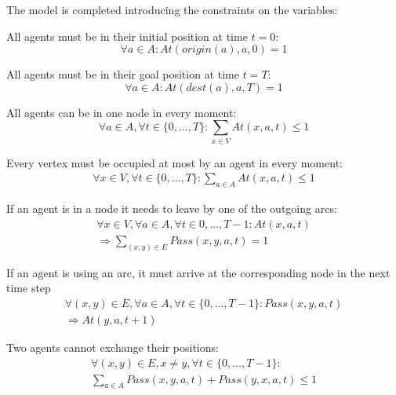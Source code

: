 \documentclass[12pt, a4paper, hidelinks]{article}
\numberwithin{equation}{section}
\begin{document}
The model is completed introducing the constraints on the variables:

\begin{description}\label{equation_set_1}
\item All agents must be in their initial position at time $t = 0$:
\begin{equation}
\forall a \in A: At(origin(a), a, 0) = 1
\label{eq:1.1}\end{equation}

\item All agents must be in their goal position at time $t = T$:
\begin{equation}
\forall a \in A : At(dest(a), a, T) = 1
\label{eq:1.2}\end{equation}

\item All agents can be in one node in every moment:
\begin{equation}
\forall a \in A, \forall t \in \{0,\dots,T\}: \displaystyle\sum_{x \in V}At(x,a,t)\leq1
\label{eq:1.3}\end{equation}

\item Every vertex must be occupied at most by an agent in every moment:
\begin{equation}\begin{split}
\forall x \in V, \forall t \in \{0,\dots,T\}: \displaystyle\sum_{a \in A}At(x,a,t)\leq1
\end{split}\label{eq:1.4}\end{equation}

\item If an agent is in a node it needs to leave by one of the outgoing arcs:
\begin{equation}\begin{split}
\forall x \in V, \forall a \in A, \forall t \in {0,\dots,T-1}: At(x,a,t) \\
\Rightarrow  \displaystyle\sum_{(x,y) \in E}Pass(x,y,a,t)=1
\end{split}\label{eq:1.5}\end{equation}

\item If an agent is using an arc, it must arrive at the corresponding node in the next time step
\begin{equation}\begin{split}
\forall (x,y) \in E, \forall a \in A, \forall t \in \{0,\dots,T-1\}: Pass(x,y,a,t) \\
\Rightarrow At(y,a,t+1)
\end{split}\label{eq:1.6}
\end{equation}

\item Two agents cannot exchange their positions:
\begin{equation}\begin{split}
\forall (x,y) \in E, x \neq y, \forall t \in \{0,\dots,T-1\}: \\
\displaystyle\sum_{a \in A}Pass(x,y,a,t) + Pass(y,x,a,t) \leq 1
\end{split}\label{eq:1.7}\end{equation}
\end{description}
\end{document}
